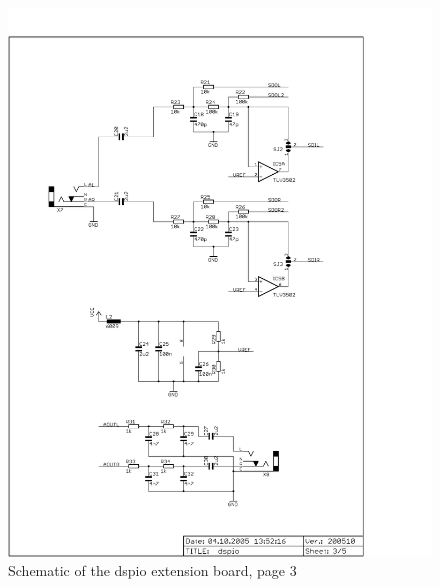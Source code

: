 \begin{figure}
    \centering
    \includegraphics[scale=0.68]{appendix/dspio_p3}
    \caption{Schematic of the dspio extension board, page 3}
\end{figure}
